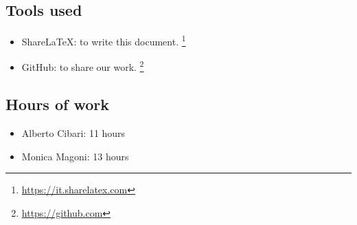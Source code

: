 \subsection*{Tools used}
    \begin{itemize}
        \item ShareLaTeX: to write this document. \footnote{\url{https://it.sharelatex.com}}
        \item GitHub: to share our work. \footnote{\url{https://github.com}} 
    \end{itemize}
\subsection*{Hours of work}
    \begin{itemize}
        \item Alberto Cibari: 11 hours
        \item Monica Magoni: 13 hours
    \end{itemize}
